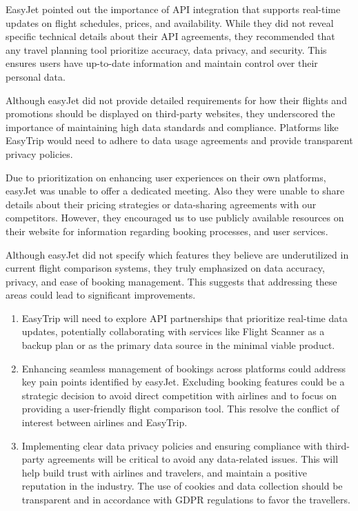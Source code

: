 EasyJet pointed out the importance of API integration that supports real-time updates on flight schedules, prices, and availability. While they did not reveal specific technical details about their API agreements, they recommended that any travel planning tool prioritize accuracy, data privacy, and security. This ensures users have up-to-date information and maintain control over their personal data.

Although easyJet did not provide detailed requirements for how their flights and promotions should be displayed on third-party websites, they underscored the importance of maintaining high data standards and compliance. Platforms like EasyTrip would need to adhere to data usage agreements and provide transparent privacy policies.

Due to prioritization on enhancing user experiences on their own platforms, easyJet was unable to offer a dedicated meeting. Also they were unable to share details about their pricing strategies or data-sharing agreements with our competitors. However, they encouraged us to use publicly available resources on their website for information regarding booking processes, and user services.

Although easyJet did not specify which features they believe are underutilized in current flight comparison systems, they truly emphasized on data accuracy, privacy, and ease of booking management. This suggests that addressing these areas could lead to significant improvements.

\begin{enumerate}
    \item EasyTrip will need to explore API partnerships that prioritize real-time data updates, potentially collaborating with services like Flight Scanner as a backup plan or as the primary data source in the minimal viable product.
    \item Enhancing seamless management of bookings across platforms could address key pain points identified by easyJet. Excluding booking features could be a strategic decision to avoid direct competition with airlines and to focus on providing a user-friendly flight comparison tool. This resolve the conflict of interest between airlines and EasyTrip.
    \item Implementing clear data privacy policies and ensuring compliance with third-party agreements will be critical to avoid any data-related issues. This will help build trust with airlines and travelers, and maintain a positive reputation in the industry. The use of cookies and data collection should be transparent and in accordance with GDPR regulations to favor the travellers.
\end{enumerate}